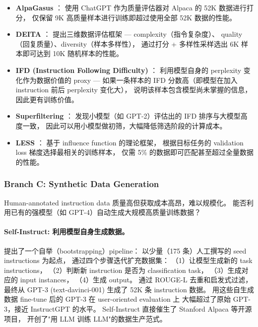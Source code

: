 \begin{itemize}[leftmargin=2em]
  \item \textbf{AlpaGasus} \cite{chen2024alpagasus}：
    使用 ChatGPT 作为质量评估器对 Alpaca 的 52K 数据进行打分，
    仅保留 9K 高质量样本进行训练即超过使用全部 52K 数据的性能。

  \item \textbf{DEITA} \cite{liu2024deita}：
    提出三维数据评估框架 --- complexity（指令复杂度）、
    quality（回复质量）、diversity（样本多样性），
    通过打分 + 多样性采样选出 6K 样本即可达到 10K 随机样本的性能。

  \item \textbf{IFD (Instruction Following Difficulty)} \cite{li2023ifd}：
    利用模型自身的 perplexity 变化作为数据价值的 proxy ---
    如果一条样本的 IFD 分数高（即模型在加入 instruction 前后 perplexity 变化大），
    说明该样本包含模型尚未掌握的信息，因此更有训练价值。

  \item \textbf{Superfiltering} \cite{li2024superfiltering}：
    发现小模型（如 GPT-2）评估出的 IFD 排序与大模型高度一致，
    因此可以用小模型做初筛，大幅降低筛选阶段的计算成本。

  \item \textbf{LESS} \cite{xia2024less}：
    基于 influence function 的理论框架，
    根据目标任务的 validation loss 梯度选择最相关的训练样本，
    仅需 5\% 的数据即可匹配甚至超过全量数据的性能。
\end{itemize}

\subsubsection{Branch C: Synthetic Data Generation}
\label{sec:t7-synthetic}

\begin{problembox}
Human-annotated instruction data 质量高但获取成本高昂，难以规模化。
能否利用已有的强模型（如 GPT-4）自动生成大规模高质量训练数据？
\end{problembox}

\paragraph{Self-Instruct: 利用模型自身生成数据。}
 提出了一个自举（bootstrapping）pipeline：
以少量（175 条）人工撰写的 seed instructions 为起点，
通过四个步骤迭代扩充数据集：
（1）让模型生成新的 task instructions，
（2）判断新 instruction 是否为 classification task，
（3）生成对应的 input instances，
（4）生成 output。
通过 ROUGE-L 去重和启发式过滤，
最终从 GPT-3 (text-davinci-001) 生成了 52K 条 instruction 数据。
用这些自生成数据 fine-tune 后的 GPT-3 在 user-oriented evaluation 上
大幅超过了原始 GPT-3，接近 InstructGPT 的水平。
Self-Instruct 直接催生了 Stanford Alpaca \cite{taori2023alpaca} 等开源项目，
开创了"用 LLM 训练 LLM"的数据生产范式。

